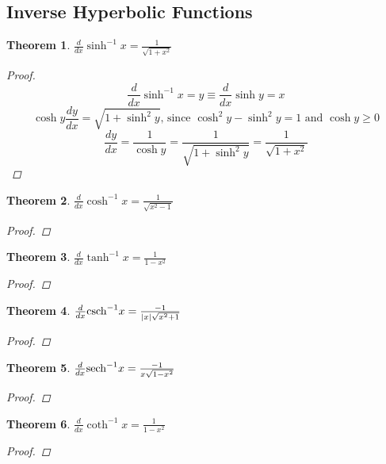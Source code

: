 \documentclass[10pt]{report}
\newtheorem{thm3}{Theorem}[subsection]
\newcommand{\csch}{\textup{csch}}
\newcommand{\sech}{\textup{sech}}
\begin{document}
\subsection{Inverse Hyperbolic Functions}
\begin{thm3}
$\frac{d}{dx}\sinh ^{-1}x= \frac{1}{\sqrt{1+x^2}}$
\begin{proof}
$$\frac{d}{dx}\sinh^{-1}x=y\equiv \frac{d}{dx}\sinh y=x$$
$$\cosh y\frac{dy}{dx}=\sqrt{1+\sinh^2y}\text{, since $\cosh^2 y- \sinh^2 y=1$ and $\cosh y\geq 0$}$$
$$\frac{dy}{dx}=\frac{1}{\cosh y}=\frac{1}{\sqrt{1+\sinh^2 y}}=\frac{1}{\sqrt{1+x^2}}$$
\end{proof}
\end{thm3}
\begin{thm3}
$\frac{d}{dx}\cosh ^{-1}x= \frac{1}{\sqrt{x^2-1}}$
\begin{proof}

\end{proof}
\end{thm3}
\begin{thm3}
$\frac{d}{dx}\tanh ^{-1}x= \frac{1}{1-x^2}$
\begin{proof}

\end{proof}
\end{thm3}
\begin{thm3}
$\frac{d}{dx}\csch^{-1}x= \frac{-1}{|x|\sqrt{x^2+1}}$
\begin{proof}

\end{proof}
\end{thm3}
\begin{thm3}
$\frac{d}{dx}\sech^{-1}x= \frac{-1}{x\sqrt{1-x^2}}$
\begin{proof}

\end{proof}
\end{thm3}
\begin{thm3}
$\frac{d}{dx}\coth ^{-1}x =\frac{1}{1-x^2}$
\begin{proof}

\end{proof}
\end{thm3}
\end{document}
